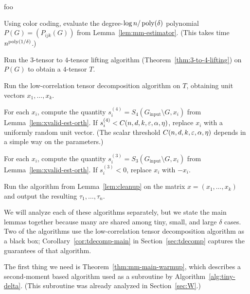 \begin{algorithm}\label{alg:large-delta} \color{white}foo\color{black}\\
  \begin{compactenum}
    \item Using color coding, evaluate the degree-$\log n / \operatorname{poly}(\delta)$ polynomial $P(G) = (P_{ijk}(G))$ from Lemma~\ref{lem:mm-estimator}.
    (This takes time $n^{\operatorname{poly}(1/\delta)}$.)
    \item Run the $3$-tensor to $4$-tensor lifting algorithm (Theorem~\ref{thm:3-to-4-lifting}) on $P(G)$ to obtain a $4$-tensor $T$.
    \item Run the low-correlation tensor decomposition algorithm on $T$, obtaining unit vectors $x_1,\ldots,x_k$.
    \item \label{itm:large-delta-1} For each $x_i$, compute the quantity $s_i^{(4)} = S_4(G_{\text{input}} \setminus G, x_i)$ from Lemma~\ref{lem:xvalid-est-orth}.
    If $s_i^{(4)} < C(n,d,k,\varepsilon,\alpha,\eta)$, replace $x_i$ with a uniformly random unit vector.
    (The scalar threshold $C(n,d,k,\varepsilon,\alpha,\eta)$ depends in a simple way on the parameters.)
    \item \label{itm:large-delta-2}  For each $x_i$, compute the quantity $s_i^{(3)} = S_3(G_{\text{input}} \setminus G, x_i)$ from Lemma~\ref{lem:xvalid-est-orth}.
    If $s_i^{(3)} < 0$, replace $x_i$ with $-x_i$.
    \item Run the algorithm from Lemma~\ref{lem:cleanup} on the matrix $x = (x_1,\ldots,x_k)$ and output the resulting $\tau_1,\ldots,\tau_n$.
  \end{compactenum}
\end{algorithm}

We will analyze each of these algorithms separately, but we state the main lemmas together because many are shared among tiny, small, and large $\delta$ cases.
Two of the algorithms use the low-correlation tensor decomposition algorithm as a black box; Corollary~\ref{cor:tdecomp-main} in Section~\ref{sec:tdecomp} captures the guarantees of that algorithm.

The first thing we need is Theorem~\ref{thm:mm-main-warmup}, which describes a second-moment based algorithm used as a subroutine by Algorithm~\ref{alg:tiny-delta}.
(This subroutine was already analyzed in Section~\ref{sec:W}.)


